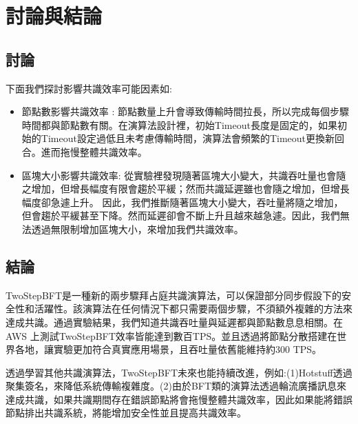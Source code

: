 \chapter{討論與結論}\label{se_8}
\section{討論}\label{se_8} 
下面我們探討影響共識效率可能因素如:

\begin{itemize}%

\item 節點數影響共識效率 :
節點數量上升會導致傳輸時間拉長，所以完成每個步驟時間都與節點數有關。在演算法設計裡，初始Timeout長度是固定的，如果初始的Timeout設定過低且未考慮傳輸時間，演算法會頻繁的Timeout更換新回合。進而拖慢整體共識效率。

\item 區塊大小影響共識效率:
從實驗裡發現隨著區塊大小變大，共識吞吐量也會隨之增加，但增長幅度有限會趨於平緩；然而共識延遲雖也會隨之增加，但增長幅度卻急遽上升。
因此，我們推斷隨著區塊大小變大，吞吐量將隨之增加，但會趨於平緩甚至下降。然而延遲卻會不斷上升且越來越急遽。因此，我們無法透過無限制增加區塊大小，來增加我們共識效率。


\end{itemize}

\section{結論}\label{se_8}
TwoStepBFT是一種新的兩步驟拜占庭共識演算法，可以保證部分同步假設下的安全性和活躍性。該演算法在任何情況下都只需要兩個步驟，不須額外複雜的方法來達成共識。通過實驗結果，我們知道共識吞吐量與延遲都與節點數息息相關。在AWS 上測試TwoStepBFT效率皆能達到數百TPS。並且透過將節點分散搭建在世界各地，讓實驗更加符合真實應用場景，且吞吐量依舊能維持約300 TPS。

透過學習其他共識演算法，TwoStepBFT未來也能持續改進，例如:(1)Hotstuff透過聚集簽名，來降低系統傳輸複雜度。(2)由於BFT類的演算法透過輪流廣播訊息來達成共識，如果共識期間存在錯誤節點將會拖慢整體共識效率，因此如果能將錯誤節點排出共識系統，將能增加安全性並且提高共識效率。

